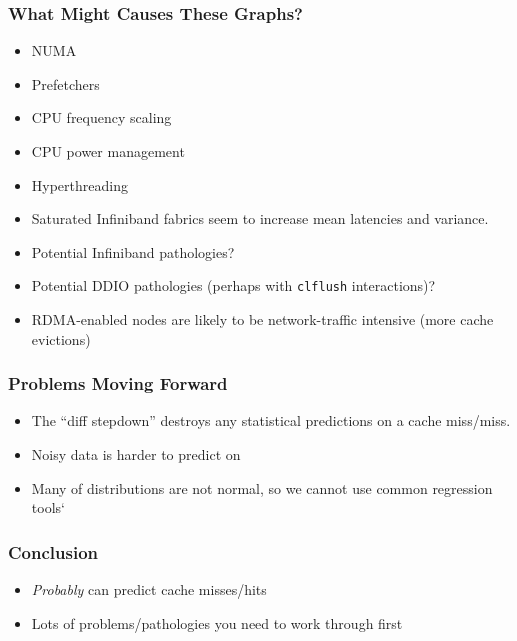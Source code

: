 \documentclass{beamer}
\begin{document}
\begin{frame}
 \frametitle{What Might Causes These Graphs?}
 \begin{itemize}
  \item NUMA
  \item Prefetchers
  \item CPU frequency scaling
  \item CPU power management
  \item Hyperthreading
  \item Saturated Infiniband fabrics seem to increase mean latencies and variance.
  \item Potential Infiniband pathologies?
  \item Potential DDIO pathologies (perhaps with \texttt{clflush} interactions)?
  \item RDMA-enabled nodes are likely to be network-traffic intensive (more cache evictions)
 \end{itemize}
\end{frame}

\begin{frame}
 \frametitle{Problems Moving Forward}
 \begin{itemize}
  \item The ``diff stepdown'' destroys any statistical predictions on a cache miss/miss.
  \item Noisy data is harder to predict on
  \item Many of distributions are not normal, so we cannot use common regression tools`
 \end{itemize}
\end{frame}


\begin{frame}
 \frametitle{Conclusion}
 \begin{itemize}
  \item \textit{Probably} can predict cache misses/hits
  \item Lots of problems/pathologies you need to work through first
 \end{itemize}

\end{frame}
\end{document}
